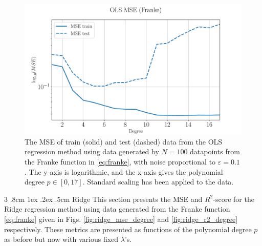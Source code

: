 \documentclass[%
reprint,
amsmath,amssymb,
aps,
pra,
]{revtex4-2}
\makeatletter
\renewcommand{\subsubsection}{%
	\@startsection
	{subsubsection}%
	{3}%
	{\z@}%
	{.8cm \@plus1ex \@minus .2ex}%
	{.5cm}%
	{\normalfont\small\centering}%
}
\makeatother
\begin{document}
\begin{figure}[ht!]
	\centering
	\includegraphics[width=\linewidth]{Python/Figures/OLS/OLS_MSE_StandardScaling.pdf}
	\caption{The MSE of train (solid) and test (dashed) data from the OLS regression method using data generated by \(N=100\) datapoints from the Franke function in \eqref{eq:franke}, with noise proportional to \(\varepsilon=0.1\). The y-axis is logarithmic, and the x-axis gives the polynomial degree \(p\in[0,17]\). Standard scaling has been applied to the data.}
	\label{fig:OLS_mse_degree_standard}
\end{figure}

\subsubsection{Ridge}
This section presents the MSE and \(R^2\)-score for the Ridge regression method using data generated from the Franke function \eqref{eq:franke} given in Figs. \ref{fig:ridge_mse_degree} and \ref{fig:ridge_r2_degree} respectively. These metrics are presented as functions of the polynomial degree \(p\) as before but now with various fixed \(\lambda \)'s. 
\end{document}
